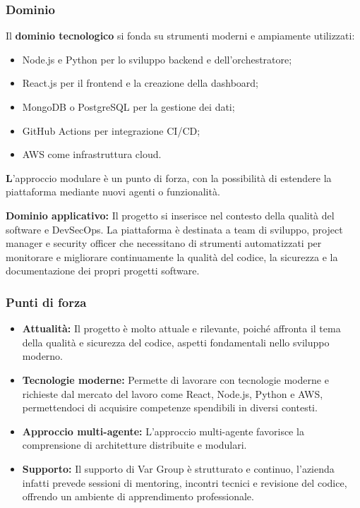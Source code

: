 \documentclass{article}
\begin{document}
	\subsubsection{Dominio}
Il \textbf{dominio tecnologico} si fonda su strumenti moderni e ampiamente utilizzati:
\vspace{-0.3em}
\begin{itemize}
    \setlength\itemsep{-0.1em}
    \item Node.js e Python per lo sviluppo backend e dell'orchestratore;
    \item React.js per il frontend e la creazione della dashboard;
    \item MongoDB o PostgreSQL per la gestione dei dati;
    \item GitHub Actions per integrazione CI/CD;
    \item AWS come infrastruttura cloud.
\end{itemize}
\vspace{-0.3em}
    \textbf L'approccio modulare è un punto di forza, con la possibilità di estendere la piattaforma mediante nuovi agenti o funzionalità.

    \vspace{1em}
	
	\textbf{Dominio applicativo:} Il progetto si inserisce nel contesto della qualità del software e DevSecOps. La piattaforma è destinata a team di sviluppo, project manager e security officer che necessitano di strumenti automatizzati per monitorare e migliorare continuamente la qualità del codice, la sicurezza e la documentazione dei propri progetti software.
	
	\subsubsection{Punti di forza}
	\begin{itemize}
		\item \textbf{Attualità:} Il progetto è molto attuale e rilevante, poiché affronta il tema della qualità e sicurezza del codice, aspetti fondamentali nello sviluppo moderno.
		\item \textbf{Tecnologie moderne:} Permette di lavorare con tecnologie moderne e richieste dal mercato del lavoro come React, Node.js, Python e AWS, permettendoci di acquisire competenze spendibili in diversi contesti.
		\item \textbf{Approccio multi-agente:} L’approccio multi-agente favorisce la comprensione di architetture distribuite e modulari.
		\item \textbf{Supporto:} Il supporto di Var Group è strutturato e continuo, l’azienda infatti prevede sessioni di mentoring, incontri tecnici e revisione del codice, offrendo un ambiente di apprendimento professionale.
	\end{itemize}
	
\end{document}
